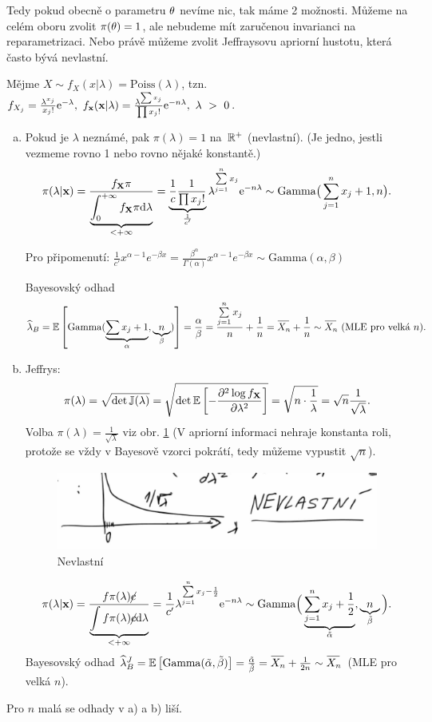 Tedy pokud obecně o parametru $\theta$ nevíme nic, tak máme 2 možnosti. Můžeme na celém oboru zvolit $\pi(\theta)=1$, ale nebudeme mít zaručenou invarianci na reparametrizaci. Nebo právě můžeme zvolit Jeffraysovu apriorní hustotu, která často bývá nevlastní.
\begin{example}
	Mějme $X\sim f_X(x|\lambda)=\mathrm{Poiss}(\lambda)$, tzn. $f_{X_j}=\frac{\lambda^{x_j}}{x_j!}\mathrm{e}^{-\lambda},~f_\textbf{x}(\textbf{x}|\lambda)=\frac{\lambda^{\sum x_j}}{\prod x_j!}\mathrm{e}^{-n\lambda},~\lambda~>~0$.\begin{enumerate}[a)]
		\item Pokud je $\lambda$ neznámé, pak $\pi(\lambda)=1$ na~$\mathbb{R}^+$ (nevlastní). (Je jedno, jestli vezmeme rovno 1 nebo rovno nějaké konstantě.)
		$$
		\pi(\lambda|\textbf{x})=\frac{f_{\textbf{X}} \pi}{\underbrace{\int_{0}^{+\infty}f_{\textbf{X}}\pi\mathrm{d}\lambda}_{<+\infty}}=\underbrace{\frac{1}{c}\frac{1}{\prod x_j!}}_{\frac{1}{c'}}\lambda^{\sum\limits_{j=1}^{n} x_j}\mathrm{e}^{-n\lambda}\sim\mathrm{Gamma}\big(\sum\limits_{j=1}^{n} x_j+1,n\big).$$
		
		Pro připomenutí: $\frac{1}{c'}x^{\alpha-1}e^{-\beta x}=\frac{\beta^{\alpha}}{\Gamma(\alpha)}x^{\alpha-1}e^{-\beta x } \sim \mathrm{Gamma}(\alpha,\beta) $
		
		Bayesovský odhad
		 $$\widehat{\lambda}_B=\EE{\mathrm{Gamma}(\underbrace{\sum x_j+1}_{\alpha},\underbrace{n}_\beta)}=\frac{\alpha}{\beta}=\frac{\sumjn x_j}{n}+\frac{1}{n}=\Oxn+\frac{1}{n}\sim \Oxn~(\text{MLE pro velká }n).$$
		\item Jeffrys: $$\pi(\lambda)=\sqrt{\det \mathbb{J}(\lambda)}=\sqrt{\det \mathbb{E}\left[ -\frac{\partial^2\log f_{\textbf{X}}}{\partial\lambda^2} \right]}=\sqrt{n\cdot\frac{1}{\lambda}}=\sqrt{n}\frac{1}{\sqrt{\lambda}}.$$
		Volba $\pi(\lambda)=\frac{1}{\sqrt{\lambda}}$ viz obr. \ref{fig:p72} (V apriorní informaci nehraje konstanta roli, protože se vždy v Bayesově vzorci pokrátí, tedy můžeme vypustit $\sqrt{n}$).
		\begin{figure}[h]
			\centering
			\includegraphics[width=0.5\linewidth]{pictures/P7_2}
			\caption{Nevlastní}
			\label{fig:p72}
		\end{figure}
		$$ \pi(\lambda|\textbf{x})=\frac{f \pi(\lambda)\cancel{c}}{\underbrace{\int f\pi(\lambda)\cancel{c}\mathrm{d}\lambda}_{<+\infty}}=\frac{1}{c'}\lambda^{\sum\limits_{j=1}^{n} x_j-\frac{1}{2}}\mathrm{e}^{-n\lambda}\sim\mathrm{Gamma}\Big(\underbrace{\sum\limits_{j=1}^{n} x_j+\frac{1}{2}}_{\tilde{\alpha}},\underbrace{n}_{\tilde{\beta}}\Big).$$
		Bayesovský odhad $\widehat{\lambda}_B^J=\EE{\mathrm{Gamma}(\tilde{\alpha},\tilde{\beta})}=\frac{\tilde{\alpha}}{\tilde{\beta}}=\Oxn+\frac{1}{2n}\sim\Oxn$ (MLE pro velká $n$).
	\end{enumerate}
	Pro $n$ malá se odhady v a) a b) liší.
\end{example}

